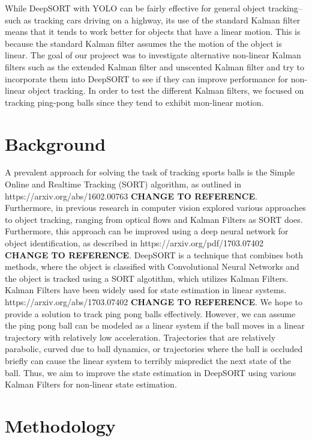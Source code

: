 \documentclass[10pt,twocolumn,letterpaper]{article}
\begin{document}
  While DeepSORT with YOLO can be fairly effective for general object tracking--such as tracking 
  cars driving on a highway, its use of the standard Kalman filter means that it tends to work better for 
  objects that have a linear motion. This is because the standard Kalman filter assumes the the motion of the object is linear.  
  The goal of our projeect was to investigate alternative non-linear Kalman filters such as the extended Kalman filter and 
  unscented Kalman filter and try to incorporate them into DeepSORT to see if they can improve performance for non-linear object tracking. 
  In order to test the different Kalman filters, we focused on tracking ping-pong balls since they tend to exhibit mon-linear motion. 


\section{Background}
\label{sec:background}
A prevalent approach for
solving the task of tracking sports balls is the Simple Online and Realtime Tracking (SORT) algorithm, as outlined in
https://arxiv.org/abs/1602.00763 \textbf{CHANGE TO REFERENCE}. 
Furthermore, in previous research in computer vision explored various approaches to object tracking, ranging from optical
 flows and Kalman Filters as SORT does. Furthermore, this approach can be
improved using a deep neural network for object identification, as described in
https://arxiv.org/pdf/1703.07402 \textbf{CHANGE TO REFERENCE}.
DeepSORT is a technique that combines both methods, where the object is classified with
Convolutional Neural Networks and the object is tracked using a SORT algotithm, which utilizes Kalman Filters. 
Kalman Filters have been widely used for state estimation in linear systems. https://arxiv.org/abs/1703.07402 \textbf{CHANGE TO REFERENCE}.
We hope to provide a solution to track ping pong balls effectively. However, we can assume the ping pong ball can be modeled as a linear system
if the ball moves in a linear trajectory with relatively low acceleration. Trajectories that are relatively parabolic, curved due to ball dynamics, or trajectories where the ball is occluded briefly can cause the linear system to terribly mispredict the next state of the ball. Thus, we aim to improve the state estimation in DeepSORT using various Kalman Filters for non-linear state estimation.


\section{Methodology}
\label{sec:methodology}
\end{document}
